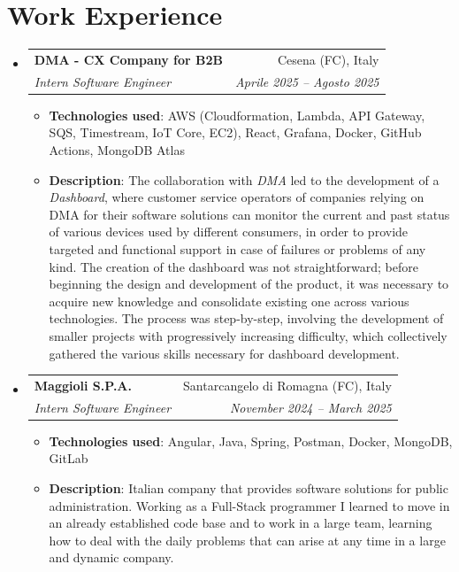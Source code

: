 \documentclass[letterpaper,11pt]{article}
\makeatletter
\newcommand{\resumeItem}[2]{
  \item\small{
    \textbf{#1}{: #2 \vspace{-2pt}}
  }
}
\newcommand{\resumeSubheading}[4]{
  \vspace{-1pt}\item
    \begin{tabular*}{0.97\textwidth}{l@{\extracolsep{\fill}}r}
      \textbf{#1} & #2 \\
      \textit{\small#3} & \textit{\small #4} \\
    \end{tabular*}\vspace{-5pt}
}
\newcommand{\resumeSubHeadingListStart}{\begin{itemize}[leftmargin=*]}
\newcommand{\resumeSubHeadingListEnd}{\end{itemize}}
\newcommand{\resumeItemListStart}{\begin{itemize}}
\newcommand{\resumeItemListEnd}{\end{itemize}\vspace{-5pt}}
\makeatother
\begin{document}
\section{Work Experience}
\resumeSubHeadingListStart
    \resumeSubheading{DMA - CX Company for B2B}{Cesena (FC), Italy}{Intern Software Engineer}{Aprile 2025 -- Agosto 2025}
    \resumeItemListStart
        \resumeItem{Technologies used} {AWS (Cloudformation, Lambda, API Gateway, SQS, Timestream, IoT Core, EC2), React, Grafana, Docker, GitHub Actions, MongoDB Atlas}
        \resumeItem{Description}
        {The collaboration with \emph{DMA} led to the development of a \emph{Dashboard}, where customer service operators of companies relying on DMA for their software solutions can monitor the current and past status of various devices used by different consumers, in order to provide targeted and functional support in case of failures or problems of any kind. The creation of the dashboard was not straightforward; before beginning the design and development of the product, it was necessary to acquire new knowledge and consolidate existing one across various technologies. The process was step-by-step, involving the development of smaller projects with progressively increasing difficulty, which collectively gathered the various skills necessary for dashboard development.}
    \resumeItemListEnd
    \resumeSubheading{Maggioli S.P.A.}{Santarcangelo di Romagna (FC), Italy}{Intern Software Engineer}{November 2024 -- March 2025}
    \resumeItemListStart
        \resumeItem{Technologies used} {Angular, Java, Spring, Postman, Docker, MongoDB, GitLab}
        \resumeItem{Description}
        {Italian company that provides software solutions for public administration. Working as a Full-Stack programmer I learned to move in an already established code base and to work in a large team, learning how to deal with the daily problems that can arise at any time in a large and dynamic company.}
    \resumeItemListEnd
\resumeSubHeadingListEnd

\end{document}
